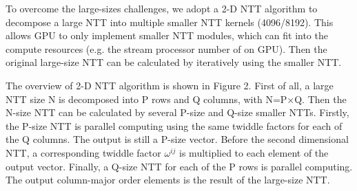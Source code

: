 To overcome the large-sizes challenges, we adopt a 2-D NTT algorithm to decompose a large NTT into multiple smaller NTT kernels (4096/8192). This allows GPU to only implement smaller NTT modules, which can fit into the compute resources (e.g. the stream processor number of on GPU). Then the original large-size NTT can be calculated by iteratively using the smaller NTT.

The overview of 2-D NTT algorithm is shown in Figure 2. First of all, a large NTT size N is decomposed into P rows and Q columns, with N=P×Q. Then the N-size NTT can be calculated by several P-size and Q-size smaller NTTs. Firstly, the P-size NTT is parallel computing using the same twiddle factors for each of the Q columns. The output is still a P-size vector. Before the second dimensional NTT, a corresponding twiddle factor $\omega^{ij}$ is multiplied to each element of the output vector. Finally, a Q-size NTT for each of the P rows is parallel computing. The output column-major order elements is the result of the large-size NTT.
